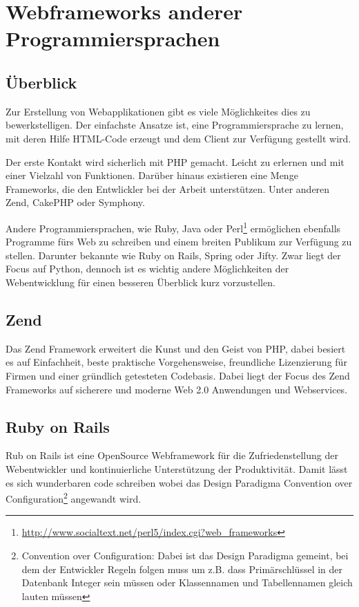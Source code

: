 \section{Webframeworks anderer Programmiersprachen}
\subsection{Überblick}
Zur Erstellung von Webapplikationen gibt es viele Möglichkeites dies zu
bewerkstelligen. Der einfachste Ansatze ist, eine Programmiersprache zu lernen,
mit deren Hilfe HTML-Code erzeugt und dem Client zur Verfügung gestellt
wird.

Der erste Kontakt wird sicherlich mit PHP gemacht. Leicht zu erlernen und
mit einer Vielzahl von Funktionen. Darüber hinaus existieren eine Menge
Frameworks, die den Entwlickler bei der Arbeit unterstützen. Unter anderen Zend,
CakePHP oder Symphony.

Andere Programmiersprachen, wie Ruby, Java oder
Perl\footnote{\url{http://www.socialtext.net/perl5/index.cgi?web_frameworks}} 
ermöglichen ebenfalls Programme fürs Web zu schreiben und einem breiten 
Publikum zur Verfügung zu stellen. Darunter bekannte wie Ruby on Rails, Spring 
oder Jifty. Zwar liegt der Focus auf Python, dennoch ist es wichtig andere 
Möglichkeiten der Webentwicklung für einen besseren Überblick kurz vorzustellen.

\subsection{Zend}
Das Zend Framework erweitert die Kunst und den Geist von PHP, dabei besiert es
auf Einfachheit, beste praktische Vorgehensweise, freundliche Lizenzierung für
Firmen und einer gründlich getesteten Codebasis. Dabei liegt der Focus des Zend
Frameworks auf sicherere und moderne Web 2.0 Anwendungen und Webservices.
\cite{zend}

\subsection{Ruby on Rails}
Rub on Rails ist eine OpenSource Webframework für die Zufriedenstellung der
Webentwickler und kontinuierliche Unterstützung der Produktivität. Damit lässt
es sich wunderbaren code schreiben wobei das Design Paradigma Convention over
Configuration\footnote{Convention over Configuration: Dabei ist das Design
Paradigma gemeint, bei dem der Entwickler Regeln folgen muss um z.B. dass
Primärschlüssel in der Datenbank Integer sein müssen oder Klassennamen und
Tabellennamen gleich lauten müssen} angewandt wird.\cite{rubyonrails}

